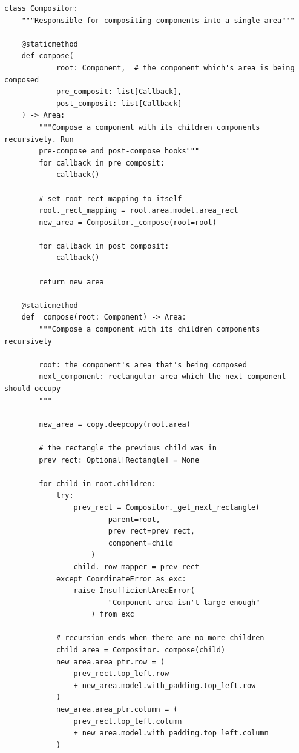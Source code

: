         \vspace{5mm}
        \begin{lstlisting}[style=py]
class Compositor:
    """Responsible for compositing components into a single area"""

    @staticmethod
    def compose(
            root: Component,  # the component which's area is being composed
            pre_composit: list[Callback],
            post_composit: list[Callback]
    ) -> Area:
        """Compose a component with its children components recursively. Run
        pre-compose and post-compose hooks"""
        for callback in pre_composit:
            callback()

        # set root rect mapping to itself
        root._rect_mapping = root.area.model.area_rect
        new_area = Compositor._compose(root=root)

        for callback in post_composit:
            callback()

        return new_area

    @staticmethod
    def _compose(root: Component) -> Area:
        """Compose a component with its children components recursively

        root: the component's area that's being composed
        next_component: rectangular area which the next component should occupy
        """

        new_area = copy.deepcopy(root.area)

        # the rectangle the previous child was in
        prev_rect: Optional[Rectangle] = None

        for child in root.children:
            try:
                prev_rect = Compositor._get_next_rectangle(
                        parent=root,
                        prev_rect=prev_rect,
                        component=child
                    )
                child._row_mapper = prev_rect
            except CoordinateError as exc:
                raise InsufficientAreaError(
                        "Component area isn't large enough"
                    ) from exc

            # recursion ends when there are no more children
            child_area = Compositor._compose(child)
            new_area.area_ptr.row = (
                prev_rect.top_left.row
                + new_area.model.with_padding.top_left.row
            )
            new_area.area_ptr.column = (
                prev_rect.top_left.column
                + new_area.model.with_padding.top_left.column
            )


\end{lstlisting}
